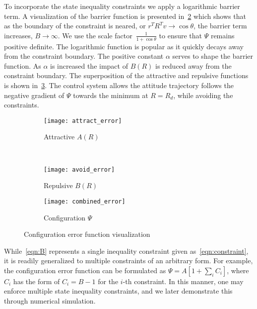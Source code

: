 \documentclass[letterpaper, 10 pt, conference]{ieeeconf}  %
\begin{document}
To incorporate the state inequality constraints we apply a logarithmic barrier term.
A visualization of the barrier function is presented in~\cref{fig:avoid_error} which shows that as the boundary of the constraint is neared, or \( r^T R^T v \to \cos \theta \), the barrier term increases, \( B \to \infty\).
We use the scale factor~\(\frac{1}{1+\cos \theta} \) to ensure that \( \Psi \) remains positive definite.
The logarithmic function is popular as it quickly decays away from the constraint boundary.
The positive constant \( \alpha \) serves to shape the barrier function.
As \( \alpha \) is increased the impact of \( B(R) \) is reduced away from the constraint boundary. 
The superposition of the attractive and repulsive functions is shown in~\cref{fig:combined_error}.
The control system allows the attitude trajectory follows the negative gradient of \( \Psi \) towards the minimum at \( R = R_d \), while avoiding the constraints.
\begin{figure} 
	\centering 
	\begin{subfigure}[htbp]{0.45\columnwidth} 
		\texttt{[image: attract\_error]} 
		\caption{Attractive \( A(R) \) } \label{fig:attract_error} 
	\end{subfigure}~ %
	\begin{subfigure}[htbp]{0.45\columnwidth} 
		\texttt{[image: avoid\_error]} 
		\caption{Repulsive \( B(R) \)} \label{fig:avoid_error} 
	\end{subfigure}
	\centering
	\begin{subfigure}[htbp]{0.45\columnwidth} 
		\texttt{[image: combined\_error]} 
		\caption{Configuration \( \Psi \)} \label{fig:combined_error} 
	\end{subfigure}
	\caption{Configuration error function visualization}
	\label{fig:config_error} 
\end{figure}

While~\cref{eqn:B} represents a single inequality constraint given as~\cref{eqn:constraint}, it is readily generalized to multiple constraints of an arbitrary form. 
For example, the configuration error function can be formulated as $\Psi=A[1+\sum_i C_i]$, where $C_i$ has the form of $C_i=B-1$ for the $i$-th constraint. 
In this manner, one may enforce multiple state inequality constraints, and we later demonstrate this through numerical simulation. 
\end{document}
